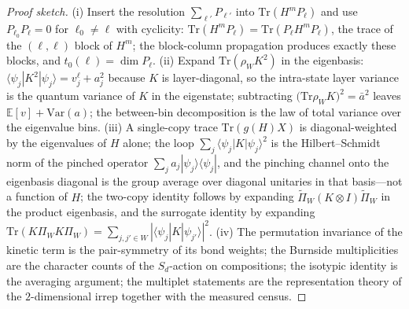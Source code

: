 \documentclass[11pt,a4paper]{article}
\theoremstyle{plain}
\theoremstyle{definition}
\theoremstyle{remark}
\begin{document}
\begin{proof}[Proof sketch]
(i) Insert the resolution $\sum_{\ell'}P_{\ell'}$ into
$\mathrm{Tr}(H^{m}P_{\ell})$ and use
$P_{\ell_0}P_{\ell}=0$ for $\ell_0\neq\ell$ with cyclicity:
$\mathrm{Tr}(H^{m}P_{\ell})=\mathrm{Tr}(P_{\ell}H^{m}P_{\ell})$, the
trace of the $(\ell,\ell)$ block of $H^{m}$; the block-column
propagation produces exactly these blocks, and
$t_0(\ell)=\dim P_{\ell}$. (ii) Expand
$\mathrm{Tr}(\rho_WK^{2})$ in the eigenbasis:
$\langle\psi_j|K^{2}|\psi_j\rangle=v^{\ell}_j+a_j^{2}$ because $K$ is
layer-diagonal, so the intra-state layer variance is the quantum variance
of $K$ in the eigenstate; subtracting
$\bigl(\mathrm{Tr}\rho_WK\bigr)^{2}=\bar a^{2}$ leaves
$\mathbb{E}[v]+\mathrm{Var}(a)$; the between-bin decomposition is the
law of total variance over the eigenvalue bins. (iii) A single-copy trace
$\mathrm{Tr}(g(H)X)$ is diagonal-weighted by the eigenvalues of $H$ alone;
the loop $\sum_j\langle\psi_j|K|\psi_j\rangle^{2}$ is the Hilbert--Schmidt
norm of the pinched operator $\sum_j a_j|\psi_j\rangle\langle\psi_j|$,
and the pinching channel onto the eigenbasis diagonal is the group average
over diagonal unitaries in that basis---not a function of $H$; the
two-copy identity follows by expanding
$\widetilde{\Pi}_{W}(K\otimes I)\widetilde{\Pi}_{W}$ in the product
eigenbasis, and the surrogate identity by expanding
$\mathrm{Tr}(K\Pi_WK\Pi_W)=\sum_{j,j'\in W}
|\langle\psi_j|K|\psi_{j'}\rangle|^{2}$. (iv) The permutation invariance
of the kinetic term is the pair-symmetry of its bond weights; the Burnside
multiplicities are the character counts of the $S_d$-action on
compositions; the isotypic identity is the averaging argument; the
multiplet statements are the representation theory of the $2$-dimensional
irrep together with the measured census.
\end{proof}
\end{document}
